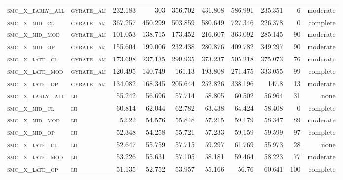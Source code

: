 \begin{landscape}
\begin{center}
\begin{footnotesize}
\begin{longtable}{llrrrrr|rrr}
\textsc{smc\_x\_early\_all} & \textsc{gyrate\_am}   & 232.183    & 303        & 356.702    & 431.808    & 586.991    & 235.351    & 6     & moderate   \\
\textsc{smc\_x\_mid\_cl   } & \textsc{gyrate\_am}   & 367.257    & 450.299    & 503.859    & 580.649    & 727.346    & 226.378    & 0     & complete   \\
\textsc{smc\_x\_mid\_mod  } & \textsc{gyrate\_am}   & 101.053    & 138.715    & 173.452    & 216.607    & 363.092    & 285.145    & 90    & moderate   \\
\textsc{smc\_x\_mid\_op   } & \textsc{gyrate\_am}   & 155.604    & 199.006    & 232.438    & 280.876    & 409.782    & 349.297    & 90    & moderate   \\
\textsc{smc\_x\_late\_cl  } & \textsc{gyrate\_am}   & 173.698    & 237.135    & 299.935    & 373.237    & 505.218    & 375.073    & 76    & moderate   \\
\textsc{smc\_x\_late\_mod } & \textsc{gyrate\_am}   & 120.495    & 140.749    & 161.13     & 193.808    & 271.475    & 333.055    & 99    & complete   \\
\textsc{smc\_x\_late\_op  } & \textsc{gyrate\_am}   & 134.082    & 168.345    & 205.644    & 252.826    & 338.196    & 147.8      & 13    & moderate   \\
\textsc{smc\_x\_early\_all} & \textsc{iji       }   & 55.242     & 56.696     & 57.714     & 58.805     & 60.502     & 56.964     & 31    & none   \\
\textsc{smc\_x\_mid\_cl   } & \textsc{iji       }   & 60.814     & 62.044     & 62.782     & 63.438     & 64.424     & 58.408     & 0     & complete   \\
\textsc{smc\_x\_mid\_mod  } & \textsc{iji       }   & 52.22      & 54.576     & 55.848     & 57.215     & 59.179     & 58.347     & 89    & moderate   \\
\textsc{smc\_x\_mid\_op   } & \textsc{iji       }   & 52.348     & 54.258     & 55.721     & 57.233     & 59.159     & 59.599     & 97    & complete   \\
\textsc{smc\_x\_late\_cl  } & \textsc{iji       }   & 52.647     & 55.759     & 57.715     & 59.297     & 61.769     & 55.973     & 28    & none   \\
\textsc{smc\_x\_late\_mod } & \textsc{iji       }   & 53.226     & 55.631     & 57.105     & 58.181     & 59.464     & 58.223     & 77    & moderate   \\
\textsc{smc\_x\_late\_op  } & \textsc{iji       }   & 51.135     & 52.752     & 53.957     & 55.166     & 56.76      & 60.641     & 100   & complete   \\

\end{longtable}
\end{footnotesize}
\end{center}
\end{landscape}
